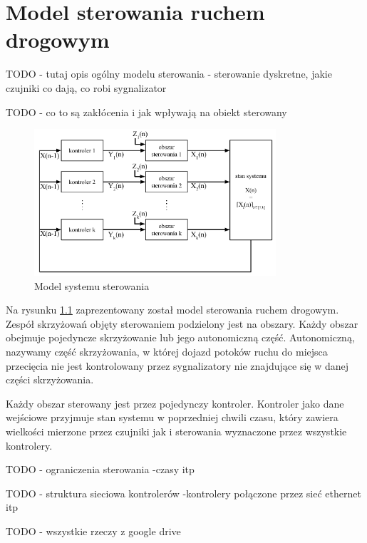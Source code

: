 \chapter{Model sterowania ruchem drogowym}
TODO - tutaj opis ogólny modelu sterowania - sterowanie dyskretne, jakie czujniki co dają, co robi sygnalizator

TODO - co to są zakłócenia i jak wpływają na obiekt sterowany

\begin{figure}[h]
    \centering
    \includegraphics[width=0.8\textwidth]{images/model.pdf}
    \caption{Model systemu sterowania}
    \label{rys:model}
\end{figure}

Na rysunku \ref{rys:model} zaprezentowany został model sterowania ruchem drogowym.
Zespół skrzyżowań objęty sterowaniem podzielony jest na obszary.
Każdy obszar obejmuje pojedyncze skrzyżowanie lub jego autonomiczną część.
Autonomiczną, nazywamy część skrzyżowania, w której dojazd potoków ruchu do miejsca przecięcia nie jest kontrolowany
przez sygnalizatory nie znajdujące się w danej części skrzyżowania.

Każdy obszar sterowany jest przez pojedynczy kontroler.
Kontroler jako dane wejściowe przyjmuje stan systemu w poprzedniej chwili czasu,
który zawiera wielkości mierzone przez czujniki jak i sterowania wyznaczone przez wszystkie kontrolery.

TODO - ograniczenia sterowania -czasy itp

TODO - struktura sieciowa kontrolerów -kontrolery połączone przez sieć ethernet itp

TODO - wszystkie rzeczy z google drive